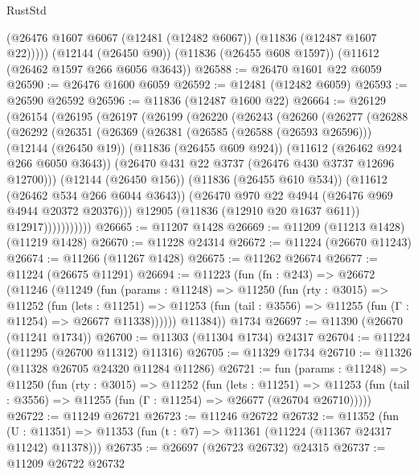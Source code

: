 \begin{lexlean}{RustStd}
\begin{coremodule}
        (@26476 @1607 @6067 (@12481 (@12482 @6067)) (@11836 (@12487 @1607 @22)))))
    (@12144 (@26450 @90))
    (@11836 (@26455 @608 @1597))
    (@11612 (@26462 @1597 @266 @6056 @3643))
@26588 := @26470 @1601 @22 @6059
@26590 := @26476 @1600 @6059
@26592 := @12481 (@12482 @6059)
@26593 := @26590 @26592
@26596 := @11836 (@12487 @1600 @22)
@26664 := @26129
    (@26154
      (@26195
        (@26197
          (@26199
            (@26220
              (@26243
                (@26260
                  (@26277
                    (@26288
                      (@26292
                        (@26351
                          (@26369
                            (@26381
                              (@26585 (@26588 (@26593 @26596)))
                              (@12144 (@26450 @19))
                              (@11836 (@26455 @609 @924))
                              (@11612 (@26462 @924 @266 @6050 @3643))
                              (@26470 @431 @22 @3737 (@26476 @430 @3737 @12696 @12700)))
                            (@12144 (@26450 @156))
                            (@11836 (@26455 @610 @534))
                            (@11612 (@26462 @534 @266 @6044 @3643))
                            (@26470 @970 @22 @4944 (@26476 @969 @4944 @20372 @20376)))
                          @12905
                          (@11836 (@12910 @20 @1637 @611))
                          @12917)))))))))))
@26665 := @11207 @1428
@26669 := @11209 (@11213 @1428) (@11219 @1428)
@26670 := @11228 @24314
@26672 := @11224 (@26670 @11243)
@26674 := @11266 (@11267 @1428)
@26675 := @11262 @26674
@26677 := @11224 (@26675 @11291)
@26694 := @11223
    (fun (fn : @243) =>
    @26672
      (@11246
        (@11249
          (fun (params : @11248) =>
          @11250
            (fun (rty : @3015) =>
            @11252
              (fun (lets : @11251) =>
              @11253 (fun (tail : @3556) => @11255 (fun (Γ : @11254) => @26677 @11338))))))
        @11384))
    @1734
@26697 := @11390 (@26670 (@11241 @1734))
@26700 := @11303 (@11304 @1734) @24317
@26704 := @11224 (@11295 (@26700 @11312) @11316)
@26705 := @11329 @1734
@26710 := @11326 (@11328 @26705 @24320 @11284 @11286)
@26721 := fun (params : @11248) =>
  @11250
    (fun (rty : @3015) =>
    @11252
      (fun (lets : @11251) =>
      @11253 (fun (tail : @3556) => @11255 (fun (Γ : @11254) => @26677 (@26704 @26710)))))
@26722 := @11249 @26721
@26723 := @11246 @26722
@26732 := @11352
    (fun (U : @11351) => @11353 (fun (t : @7) => @11361 (@11224 (@11367 @24317 @11242) @11378)))
@26735 := @26697 (@26723 @26732) @24315
@26737 := @11209 @26722 @26732

\end{coremodule}
\end{lexlean}
